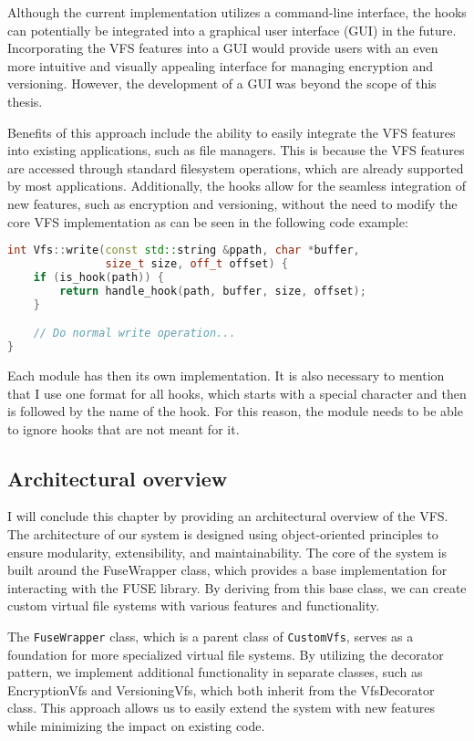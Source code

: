 Although the current implementation utilizes a command-line interface, the hooks can potentially be integrated into a graphical user interface (GUI) in the future.
Incorporating the VFS features into a GUI would provide users with an even more intuitive and visually appealing interface for managing encryption and versioning.
However, the development of a GUI was beyond the scope of this thesis.

Benefits of this approach include the ability to easily integrate the VFS features into existing applications, such as file managers.
This is because the VFS features are accessed through standard filesystem operations, which are already supported by most applications.
Additionally, the hooks allow for the seamless integration of new features, such as encryption and versioning, without the need to modify the core VFS implementation as can be seen in the following code example:

\begin{lstlisting}[language=c++, caption={Example of hook implementation}, basicstyle=\ttfamily\small]
int Vfs::write(const std::string &ppath, char *buffer,
               size_t size, off_t offset) {
    if (is_hook(path)) {
        return handle_hook(path, buffer, size, offset);
    }

    // Do normal write operation...
}
\end{lstlisting}

Each module has then its own implementation.
It is also necessary to mention that I use one format for all hooks, which starts with a special character and then is followed by the name of the hook.
For this reason, the module needs to be able to ignore hooks that are not meant for it.

\subsection{Architectural overview}\label{subsec:overview}

I will conclude this chapter by providing an architectural overview of the VFS\@.
The architecture of our system is designed using object-oriented principles to ensure modularity, extensibility, and maintainability.
The core of the system is built around the FuseWrapper class, which provides a base implementation for interacting with the FUSE library.
By deriving from this base class, we can create custom virtual file systems with various features and functionality.

The \texttt{FuseWrapper} class, which is a parent class of \texttt{CustomVfs}, serves as a foundation for more specialized virtual file systems.
By utilizing the decorator pattern, we implement additional functionality in separate classes, such as EncryptionVfs and VersioningVfs, which both inherit from the VfsDecorator class.
This approach allows us to easily extend the system with new features while minimizing the impact on existing code.

